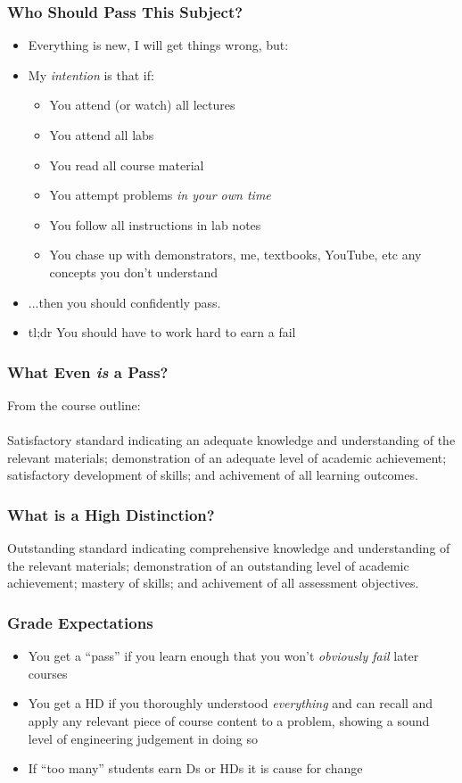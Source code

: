 \documentclass[14pt]{beamer}
\begin{document}
\begin{frame}
\frametitle{Who Should Pass This Subject?}
\begin{itemize}
\item Everything is new, I will get things wrong, but:
\item My \textit{intention} is that if:
	\begin{itemize}
		\item You attend (or watch) all lectures
		\item You attend all labs
		\item You read all course material
		\item You attempt problems \textit{in your own time}
		\item You follow all instructions in lab notes
		\item You chase up with demonstrators, me, textbooks, YouTube, etc any concepts you don't understand
	\end{itemize}
\item ...then you should confidently pass.
\item tl;dr You should have to work hard to earn a fail
\end{itemize}
\end{frame}

\begin{frame}
\frametitle{What Even \textit{is} a Pass?}
From the course outline: \\
~\\
Satisfactory standard indicating an adequate knowledge and understanding of the relevant materials; demonstration of an adequate level of academic achievement; satisfactory development of skills; and achivement of all learning outcomes.
\end{frame}

\begin{frame}
\frametitle{What is a High Distinction?}

Outstanding standard indicating comprehensive knowledge and understanding of the relevant materials; demonstration of an outstanding level of academic achievement; mastery of skills; and achivement of all assessment objectives.
\end{frame}

\begin{frame}
\frametitle{Grade Expectations}
\begin{itemize}
\item You get a ``pass'' if you learn enough that you won't \textit{obviously fail} later courses
\item You get a HD if you thoroughly understood \textit{everything} and can recall and apply any relevant piece of course content to a problem, showing a sound level of engineering judgement in doing so
\item If ``too many'' students earn Ds or HDs it is cause for change
\end{itemize}
\end{frame}
\end{document}
